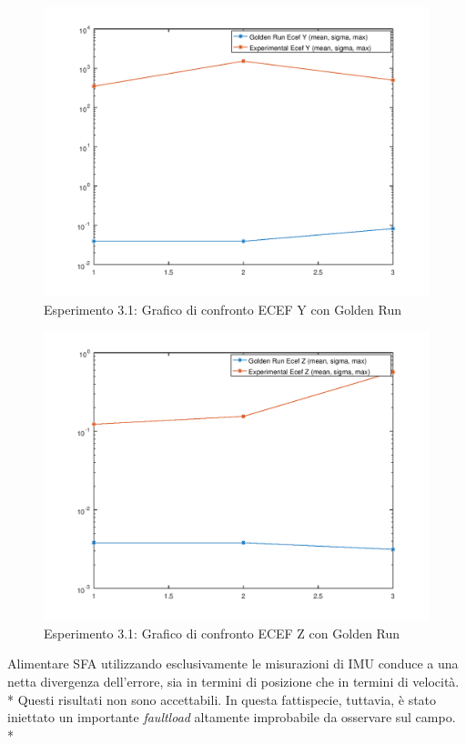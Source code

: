 \begin{figure}[h]
	\centering
	\includegraphics[width=0.7\linewidth]{img/exp11ecefY}
	\caption{Esperimento 3.1: Grafico di confronto ECEF Y con Golden Run}
\end{figure}
\begin{figure}[h]
	\centering
	\includegraphics[width=0.7\linewidth]{img/exp11ecefZ}
	\caption{Esperimento 3.1: Grafico di confronto ECEF Z con Golden Run}
\end{figure}
\FloatBarrier
Alimentare SFA utilizzando esclusivamente le misurazioni di IMU conduce a una netta divergenza dell'errore, sia in termini di posizione che in termini di velocit\`a.\\*
Questi risultati non sono accettabili. In questa fattispecie, tuttavia, \`e stato iniettato un importante \emph{faultload} altamente improbabile da osservare sul campo.\\*
